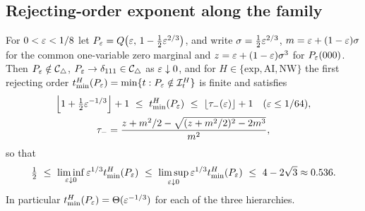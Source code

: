 \subsection{Rejecting-order exponent along the family}\label{sec:exponent}


\begin{proposition}\label{prop:family}
For $0<\varepsilon<1/8$ let $P_\varepsilon=Q\bigl(\varepsilon,\,1-\tfrac12\varepsilon^{2/3}\bigr)$, and write $\sigma=\tfrac12\varepsilon^{2/3}$, $m=\varepsilon+(1-\varepsilon)\sigma$ for the common one-variable zero marginal and $z=\varepsilon+(1-\varepsilon)\sigma^3$ for $P_\varepsilon(000)$. Then $P_\varepsilon\notin\mathcal C_{\triangle}$, $P_\varepsilon\to\delta_{111}\in\mathcal C_{\triangle}$ as $\varepsilon\downarrow0$, and for $H\in\{\mathrm{exp},\mathrm{AI},\mathrm{NW}\}$ the first rejecting order $t_{\min}^H(P_\varepsilon)=\min\{t:P_\varepsilon\notin\mathcal I^H_t\}$ is finite and satisfies
\begin{gather*}
\Bigl\lfloor1+\tfrac12\eps^{-1/3}\Bigr\rfloor+1\ \le\ \tmin^H(P_\eps)\ \le\ \lfloor\tau_-(\eps)\rfloor+1\quad(\eps\le1/64),\\
\tau_-=\frac{z+m^2/2-\sqrt{(z+m^2/2)^2-2m^3}}{m^2},
\end{gather*}
so that
\[
\tfrac12\ \le\ \liminf_{\eps\downarrow0}\eps^{1/3}\tmin^H(P_\eps)\ \le\ \limsup_{\eps\downarrow0}\eps^{1/3}\tmin^H(P_\eps)\ \le\ 4-2\sqrt3\approx0.536 .
\]
In particular $t_{\min}^H(P_\varepsilon)=\Theta(\varepsilon^{-1/3})$ for each of the three hierarchies. \end{proposition}




